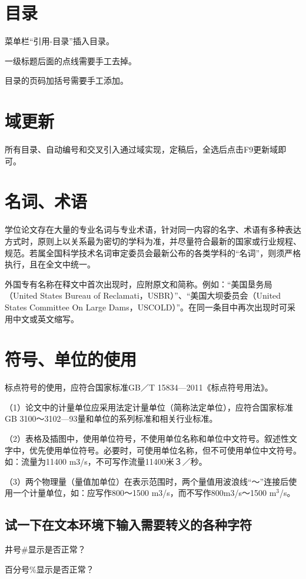 \section{目录}
菜单栏“引用-目录”插入目录。

一级标题后面的点线需要手工去掉。

目录的页码加括号需要手工添加。

\section{域更新}
所有目录、自动编号和交叉引入通过域实现，定稿后，全选后点击F9更新域即可。

\section{名词、术语}
学位论文存在大量的专业名词与专业术语，针对同一内容的名字、术语有多种表达方式时，原则上以关系最为密切的学科为准，并尽量符合最新的国家或行业规程、规范。若属全国科学技术名词审定委员会最新公布的各类学科的“名词”，则须严格执行，且在全文中统一。

外国专有名称在释文中首次出现时，应附原文和简称。例如：“美国垦务局（United States Bureau of Reclamati，USBR）”、“美国大坝委员会（United States Committee On Large Dams，USCOLD）”。在同一条目中再次出现时可采用中文或英文缩写。

\section{符号、单位的使用}
标点符号的使用，应符合国家标准GB／T 15834—2011《标点符号用法》。

（1）论文中的计量单位应采用法定计量单位（简称法定单位），应符合国家标准GB 3100～3102—93量和单位的系列标准和相关行业标准。

（2）表格及插图中，使用单位符号，不使用单位名称和单位中文符号。叙述性文字中，优先使用单位符号。必要时，可使用单位名称，但不可使用单位中文符号。如：流量为11400 m3/s，不可写作流量11400米３／秒。

（3）两个物理量（量值加单位）在表示范围时，两个量值用波浪线“～”连接后使用一个计量单位，如：应写作800～1500 m3/s，而不写作800m3/s～1500 m$^3$/s。

\subsection{试一下在文本环境下输入需要转义的各种字符}

井号\#显示是否正常？

百分号\%显示是否正常？

